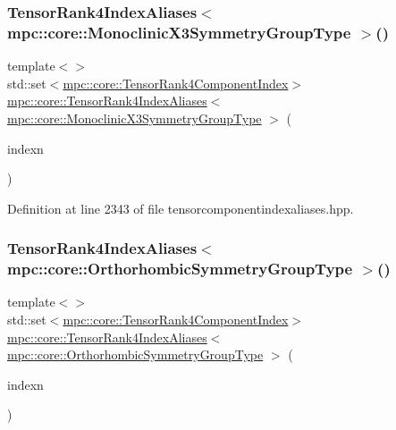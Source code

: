 \subsubsection{\texorpdfstring{Tensor\+Rank4\+Index\+Aliases$<$ mpc\+::core\+::\+Monoclinic\+X3\+Symmetry\+Group\+Type $>$()}{TensorRank4IndexAliases< mpc::core::MonoclinicX3SymmetryGroupType >()}}
{\footnotesize\ttfamily template$<$$>$ \\
std\+::set$<$\mbox{\hyperlink{namespacempc_1_1core_a54c081f41b2475abd10182bf023805d2}{mpc\+::core\+::\+Tensor\+Rank4\+Component\+Index}}$>$ \mbox{\hyperlink{namespacempc_1_1core_a40d1fb8009b3f7c34a6ea01a4b46027f}{mpc\+::core\+::\+Tensor\+Rank4\+Index\+Aliases}}$<$ \mbox{\hyperlink{structmpc_1_1core_1_1_monoclinic_x3_symmetry_group_type}{mpc\+::core\+::\+Monoclinic\+X3\+Symmetry\+Group\+Type}} $>$ (\begin{DoxyParamCaption}\item[{const \mbox{\hyperlink{classmpc_1_1core_1_1_tensor_rank_n_component_index}{mpc\+::core\+::\+Tensor\+Rank\+N\+Component\+Index}}$<$ 4 $>$ \&}]{indexn }\end{DoxyParamCaption})\hspace{0.3cm}{\ttfamily [inline]}}



Definition at line 2343 of file tensorcomponentindexaliases.\+hpp.

\mbox{\label{namespacempc_1_1core_a5eee0ad076390ff26c6f422026fea824}} 
\subsubsection{\texorpdfstring{Tensor\+Rank4\+Index\+Aliases$<$ mpc\+::core\+::\+Orthorhombic\+Symmetry\+Group\+Type $>$()}{TensorRank4IndexAliases< mpc::core::OrthorhombicSymmetryGroupType >()}}
{\footnotesize\ttfamily template$<$$>$ \\
std\+::set$<$\mbox{\hyperlink{namespacempc_1_1core_a54c081f41b2475abd10182bf023805d2}{mpc\+::core\+::\+Tensor\+Rank4\+Component\+Index}}$>$ \mbox{\hyperlink{namespacempc_1_1core_a40d1fb8009b3f7c34a6ea01a4b46027f}{mpc\+::core\+::\+Tensor\+Rank4\+Index\+Aliases}}$<$ \mbox{\hyperlink{structmpc_1_1core_1_1_orthorhombic_symmetry_group_type}{mpc\+::core\+::\+Orthorhombic\+Symmetry\+Group\+Type}} $>$ (\begin{DoxyParamCaption}\item[{const \mbox{\hyperlink{classmpc_1_1core_1_1_tensor_rank_n_component_index}{mpc\+::core\+::\+Tensor\+Rank\+N\+Component\+Index}}$<$ 4 $>$ \&}]{indexn }\end{DoxyParamCaption})\hspace{0.3cm}{\ttfamily [inline]}}



